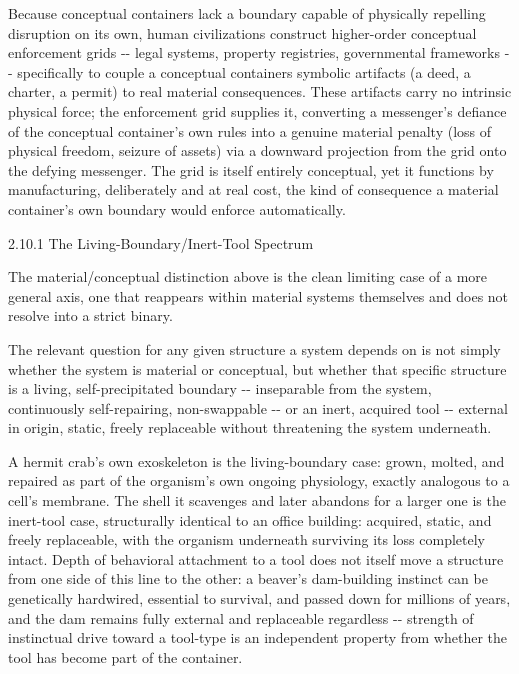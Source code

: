 \documentclass[
]{article}
\begin{document}
Because conceptual containers lack a boundary capable of physically
repelling disruption on its own, human civilizations construct
higher-order conceptual enforcement grids -\/- legal systems, property
registries, governmental frameworks -\/- specifically to couple a
conceptual containers symbolic artifacts (a deed, a charter, a permit)
to real material consequences. These artifacts carry no intrinsic
physical force; the enforcement grid supplies it, converting a
messenger's defiance of the conceptual container's own rules into a
genuine material penalty (loss of physical freedom, seizure of assets)
via a downward projection from the grid onto the defying messenger. The
grid is itself entirely conceptual, yet it functions by manufacturing,
deliberately and at real cost, the kind of consequence a material
container's own boundary would enforce automatically.

2.10.1 The Living-Boundary/Inert-Tool Spectrum

The material/conceptual distinction above is the clean limiting case of
a more general axis, one that reappears within material systems
themselves and does not resolve into a strict binary.

The relevant question for any given structure a system depends on is not
simply whether the system is material or conceptual, but whether that
specific structure is a living, self-precipitated boundary -\/-
inseparable from the system, continuously self-repairing, non-swappable
-\/- or an inert, acquired tool -\/- external in origin, static, freely
replaceable without threatening the system underneath.

A hermit crab's own exoskeleton is the living-boundary case: grown,
molted, and repaired as part of the organism's own ongoing physiology,
exactly analogous to a cell's membrane. The shell it scavenges and later
abandons for a larger one is the inert-tool case, structurally identical
to an office building: acquired, static, and freely replaceable, with
the organism underneath surviving its loss completely intact. Depth of
behavioral attachment to a tool does not itself move a structure from
one side of this line to the other: a beaver's dam-building instinct can
be genetically hardwired, essential to survival, and passed down for
millions of years, and the dam remains fully external and replaceable
regardless -\/- strength of instinctual drive toward a tool-type is an
independent property from whether the tool has become part of the
container.
\end{document}

